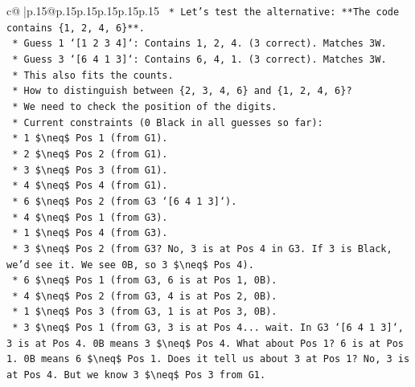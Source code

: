 \documentclass{article}
\begin{document}
{\begin{supertabular}{c@{$\;$}|p{.15\linewidth}@{}p{.15\linewidth}p{.15\linewidth}p{.15\linewidth}p{.15\linewidth}p{.15\linewidth}}
{{{\texttt{        *   Let's test the alternative: **The code contains \{1, 2, 4, 6\}**.} \\
\texttt{            *   Guess 1 `{[}1 2 3 4{]}`: Contains 1, 2, 4. (3 correct). Matches 3W.} \\
\texttt{            *   Guess 3 `{[}6 4 1 3{]}`: Contains 6, 4, 1. (3 correct). Matches 3W.} \\
\texttt{            *   This also fits the counts.} \\
\texttt{        *   How to distinguish between \{2, 3, 4, 6\} and \{1, 2, 4, 6\}?} \\
\texttt{            *   We need to check the position of the digits.} \\
\texttt{            *   Current constraints (0 Black in all guesses so far):} \\
\texttt{                *   1 \$\textbackslash{}neq\$ Pos 1 (from G1).} \\
\texttt{                *   2 \$\textbackslash{}neq\$ Pos 2 (from G1).} \\
\texttt{                *   3 \$\textbackslash{}neq\$ Pos 3 (from G1).} \\
\texttt{                *   4 \$\textbackslash{}neq\$ Pos 4 (from G1).} \\
\texttt{                *   6 \$\textbackslash{}neq\$ Pos 2 (from G3 `{[}6 4 1 3{]}`).} \\
\texttt{                *   4 \$\textbackslash{}neq\$ Pos 1 (from G3).} \\
\texttt{                *   1 \$\textbackslash{}neq\$ Pos 4 (from G3).} \\
\texttt{                *   3 \$\textbackslash{}neq\$ Pos 2 (from G3? No, 3 is at Pos 4 in G3. If 3 is Black, we'd see it. We see 0B, so 3 \$\textbackslash{}neq\$ Pos 4).} \\
\texttt{                *   6 \$\textbackslash{}neq\$ Pos 1 (from G3, 6 is at Pos 1, 0B).} \\
\texttt{                *   4 \$\textbackslash{}neq\$ Pos 2 (from G3, 4 is at Pos 2, 0B).} \\
\texttt{                *   1 \$\textbackslash{}neq\$ Pos 3 (from G3, 1 is at Pos 3, 0B).} \\
\texttt{                *   3 \$\textbackslash{}neq\$ Pos 1 (from G3, 3 is at Pos 4... wait. In G3 `{[}6 4 1 3{]}`, 3 is at Pos 4. 0B means 3 \$\textbackslash{}neq\$ Pos 4. What about Pos 1? 6 is at Pos 1. 0B means 6 \$\textbackslash{}neq\$ Pos 1. Does it tell us about 3 at Pos 1? No, 3 is at Pos 4. But we know 3 \$\textbackslash{}neq\$ Pos 3 from G1.} \\
}}}
\end{supertabular}}
\end{document}
